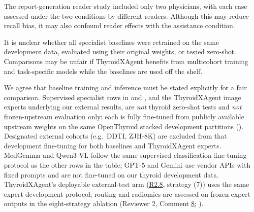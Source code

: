 \label{rev:R2.13}
\begin{reviewercomment}
The report-generation reader study included only two physicians, with each case assessed under the two conditions by different readers. Although this may reduce recall bias, it may also confound reader effects with the assistance condition.
\end{reviewercomment}
\begin{authorresponse}

\end{authorresponse}

\label{rev:R2.14}
\begin{reviewercomment}
It is unclear whether all specialist baselines were retrained on the same development data, evaluated using their original weights, or tested zero-shot. Comparisons may be unfair if ThyroidXAgent benefits from multicohort training and task-specific models while the baselines are used off the shelf.
\end{reviewercomment}
\begin{authorresponse}
We agree that baseline training and inference must be stated explicitly for a fair comparison. Supervised specialist rows in  and , and the ThyroidXAgent image experts underlying our external results, are \emph{not} thyroid zero-shot tests and \emph{not} frozen-upstream evaluation only: each is fully fine-tuned from publicly available upstream weights on the same OpenThyroid stacked development partitions (). Designated external cohorts (e.g.\ DDTI, ZJH-8K) are excluded from that development fine-tuning for both baselines and ThyroidXAgent experts. MedGemma and Qwen3-VL follow the same supervised classification fine-tuning protocol as the other rows in the table; GPT-5 and Gemini use vendor APIs with fixed prompts and are not fine-tuned on our thyroid development data. ThyroidXAgent's deployable external-test arm (\hyperref[rev:R2.8]{R2.8}, strategy (7)) uses the same expert-development protocol; routing and radiomics are assessed on frozen expert outputs in the eight-strategy ablation (Reviewer 2, Comment \hyperref[rev:R2.8]{8}; ).\par
\par
\end{authorresponse}

